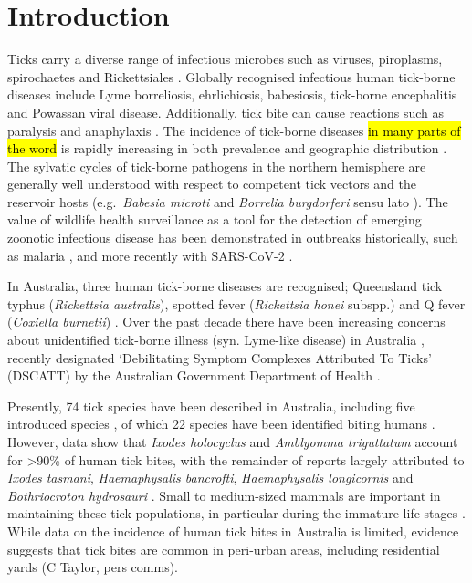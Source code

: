 \documentclass[a4paper, nobind]{templates/ociamthesis}
\begin{document}
\hypertarget{introduction-1}{%
\section{Introduction}\label{introduction-1}}

Ticks carry a diverse range of infectious microbes such as viruses, piroplasms, spirochaetes and Rickettsiales \autocite{pfaffleEcologyTickborneDiseases2013}.
Globally recognised infectious human tick-borne diseases include Lyme borreliosis, ehrlichiosis, babesiosis, tick-borne encephalitis and Powassan viral disease.
Additionally, tick bite can cause reactions such as paralysis and anaphylaxis \autocite{vannunenAssociationTickBite2009}.
The incidence of tick-borne diseases \hl{in many parts of the word} is rapidly increasing in both prevalence and geographic distribution \autocite{madison-antenucciEmergingTickBorneDiseases2020}.
The sylvatic cycles of tick-borne pathogens in the northern hemisphere are generally well understood with respect to competent tick vectors and the reservoir hosts (e.g.~\emph{Babesia microti} \autocite{westbladeBabesiaMicrotiMice2017} and \emph{Borrelia burgdorferi} sensu lato \autocite{radolfTicksMiceMen2012}).
The value of wildlife health surveillance as a tool for the detection of emerging zoonotic infectious disease has been demonstrated in outbreaks historically, such as malaria \autocite{rondonPrevalencePlasmodiumParasites2019}, and more recently with SARS-CoV-2 \autocite{plowrightLandUseinducedSpillover2021}.

In Australia, three human tick-borne diseases are recognised; Queensland tick typhus (\emph{Rickettsia australis}), spotted fever (\emph{Rickettsia honei} subspp.) and Q fever (\emph{Coxiella burnetii}) \autocite{gravesTickborneInfectiousDiseases2017}.
Over the past decade there have been increasing concerns about unidentified tick-borne illness (syn. Lyme-like disease) in Australia \autocite{chaladaThereLymelikeDisease2016}, recently designated `Debilitating Symptom Complexes Attributed To Ticks' (DSCATT) by the Australian Government Department of Health \autocite{radcliffeGrowingEvidenceEmerging2016}.

Presently, 74 tick species have been described in Australia, including five introduced species \autocite{barkerIxodesBarkeriSp2019,evansAutomaticBarcodeGap2019}, of which 22 species have been identified biting humans \autocite{kwakFirstRecordsHuman2018}.
However, data show that \emph{Ixodes holocyclus} and \emph{Amblyomma triguttatum} account for \textgreater90\% of human tick bites, with the remainder of reports largely attributed to \emph{Ixodes tasmani}, \emph{Haemaphysalis bancrofti}, \emph{Haemaphysalis longicornis} and \emph{Bothriocroton hydrosauri} \autocite{kwakFirstRecordsHuman2018}.
Small to medium-sized mammals are important in maintaining these tick populations, in particular during the immature life stages \autocite{murdochEcologyCommonMarsupial2005,lydeckerPeriurbanBlackRats2019,taylorInvasiveRabbitsHost2020}.
While data on the incidence of human tick bites in Australia is limited, evidence suggests that tick bites are common in peri-urban areas, including residential yards (C Taylor, pers comms).
\end{document}
